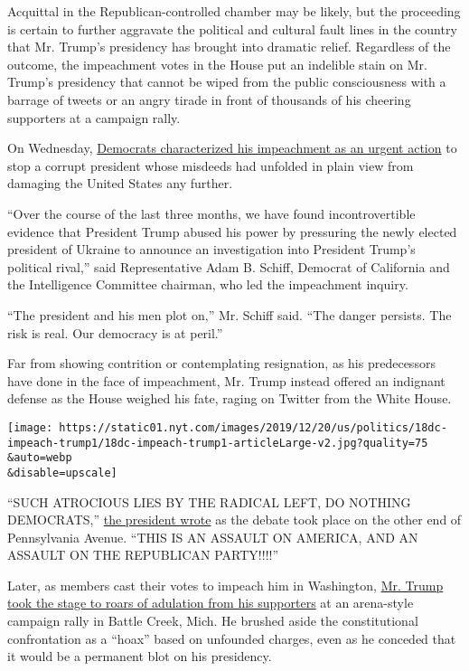 Acquittal in the Republican-controlled chamber may be likely, but the
proceeding is certain to further aggravate the political and cultural
fault lines in the country that Mr. Trump's presidency has brought into
dramatic relief. Regardless of the outcome, the impeachment votes in the
House put an indelible stain on Mr. Trump's presidency that cannot be
wiped from the public consciousness with a barrage of tweets or an angry
tirade in front of thousands of his cheering supporters at a campaign
rally.

On Wednesday,
\href{https://www.nytimes.com/2019/12/18/us/impeachment-democrats-votes.html}{Democrats
characterized his impeachment as an urgent action} to stop a corrupt
president whose misdeeds had unfolded in plain view from damaging the
United States any further.

``Over the course of the last three months, we have found
incontrovertible evidence that President Trump abused his power by
pressuring the newly elected president of Ukraine to announce an
investigation into President Trump's political rival,'' said
Representative Adam B. Schiff, Democrat of California and the
Intelligence Committee chairman, who led the impeachment inquiry.

``The president and his men plot on,'' Mr. Schiff said. ``The danger
persists. The risk is real. Our democracy is at peril.''

Far from showing contrition or contemplating resignation, as his
predecessors have done in the face of impeachment, Mr. Trump instead
offered an indignant defense as the House weighed his fate, raging on
Twitter from the White House.

\texttt{[image: https://static01.nyt.com/images/2019/12/20/us/politics/18dc-impeach-trump1/18dc-impeach-trump1-articleLarge-v2.jpg?quality=75\\\&auto=webp\\\&disable=upscale]}

``SUCH ATROCIOUS LIES BY THE RADICAL LEFT, DO NOTHING DEMOCRATS,''
\href{https://twitter.com/realDonaldTrump/status/1207355923573989376}{the
president wrote} as the debate took place on the other end of
Pennsylvania Avenue. ``THIS IS AN ASSAULT ON AMERICA, AND AN ASSAULT ON
THE REPUBLICAN PARTY!!!!''

Later, as members cast their votes to impeach him in Washington,
\href{https://www.nytimes.com/2019/12/18/us/politics/Debbie-Dingell-husband.html}{Mr.
Trump took the stage to roars of adulation from his supporters} at an
arena-style campaign rally in Battle Creek, Mich. He brushed aside the
constitutional confrontation as a ``hoax'' based on unfounded charges,
even as he conceded that it would be a permanent blot on his presidency.

